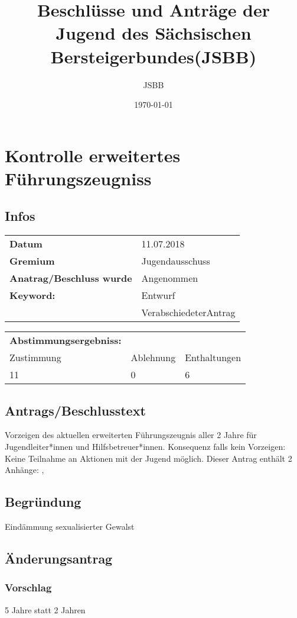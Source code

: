 \documentclass[12pt,a4paper]{scrartcl}
\begin{document}
\title{Beschlüsse und Anträge der Jugend des Sächsischen Bersteigerbundes(JSBB)}
\author{JSBB}
\date{\today}
\maketitle
\tableofcontents
\section{Kontrolle erweitertes Führungszeugniss}
\subsection{Infos}
\begin{tabularx}{\linewidth}{@{}lX}
\textbf{Datum} & 11.07.2018\\
\textbf{Gremium} & Jugendausschuss\\
\textbf{Anatrag/Beschluss wurde} & Angenommen\\
\textbf{Keyword:} & Entwurf\\
 & VerabschiedeterAntrag\\
\end{tabularx}
\begin{tabularx}{\linewidth}{@{}XXX}
\textbf{Abstimmungsergebniss:}&&\\
Zustimmung & Ablehnung & Enthaltungen \\
11 & 0 & 6 \\
\end{tabularx}
\subsection{Antrags/Beschlusstext}
Vorzeigen des aktuellen erweiterten Führungszeugnis aller 2 Jahre für Jugendleiter*innen und Hilfsbetreuer*innen. Konsequenz falls kein Vorzeigen: Keine Teilnahme an Aktionen mit der Jugend möglich.\vspace{1.5ex} 
 Dieser Antrag enthält 2 Anhänge: ,  
\subsection{Begründung}
Eindämmung sexualisierter Gewalst
\subsection{Änderungsantrag}
\subsubsection*{Vorschlag}
5 Jahre statt 2 Jahren
\end{document}
